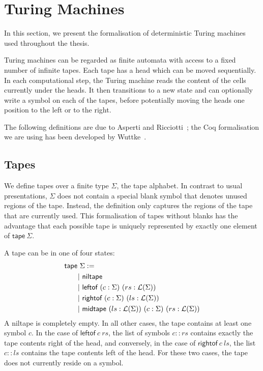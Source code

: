 \section{Turing Machines}
In this section, we present the formalisation of deterministic Turing machines used throughout the thesis. 

Turing machines can be regarded as finite automata with access to a fixed number of infinite tapes. Each tape has a head which can be moved sequentially. 
In each computational step, the Turing machine reads the content of the cells currently under the heads. It then transitions to a new state and can optionally write a symbol on each of the tapes, before potentially moving the heads one position to the left or to the right.

The following definitions are due to Asperti and Ricciotti~\cite{asperti_ricciotti}; the Coq formalisation we are using has been developed by Wuttke~\cite{wuttke2017}.

\subsection{Tapes}
We define tapes over a finite type $\Sigma$, the tape alphabet. In contrast to usual presentations, $\Sigma$ does not contain a special blank symbol that denotes unused regions of the tape. Instead, the definition only captures the regions of the tape that are currently used. 
This formalisation of tapes without blanks has the advantage that each possible tape is uniquely represented by exactly one element of $\textsf{tape}~\Sigma$. 

A tape can be in one of four states:
\begin{align*}
  \textsf{tape}~&\Sigma  := \\
  |&~\textsf{niltape} \\
  |&~\textsf{leftof}~(c : \Sigma)~(rs : \mathcal{L} (\Sigma)) \\
  |&~\textsf{rightof}~(c : \Sigma)~(ls : \mathcal{L} (\Sigma)) \\
  |&~\textsf{midtape}~(ls : \mathcal{L} (\Sigma))~(c : \Sigma)~(rs : \mathcal{L} (\Sigma))
\end{align*}
A \textsf{niltape} is completely empty. In all other cases, the tape contains at least one symbol $c$. 
In the case of $\textsf{leftof}~c~rs$, the list of symbols $c::rs$ contains exactly the tape contents right of the head, and conversely, in the case of $\textsf{rightof}~c~ls$, the list $c::ls$ contains the tape contents left of the head. For these two cases, the tape does not currently reside on a symbol.

